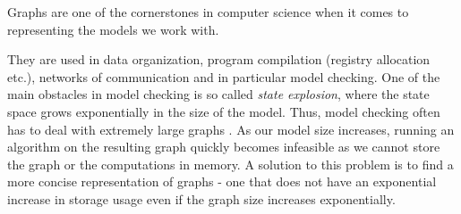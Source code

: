 \documentclass[../master/master.tex]{subfiles}
\begin{document}
Graphs are one of the cornerstones in computer science when it comes to representing the models we work with. 

They are used in data organization,  program compilation (registry allocation etc.), networks of communication and in particular model checking. One of the main obstacles in model checking is so called \textit{state explosion}, where the state space grows exponentially in the size of the model. Thus, model checking often has to deal with extremely large graphs \cite{pelanek_2004}. As our model size increases, running an algorithm on the resulting graph quickly becomes infeasible as we cannot store the graph or the computations in memory. A solution to this problem is to find a more concise representation of graphs - one that does not have an exponential increase in storage usage even if the graph size increases exponentially. 

\cite{tarjan_1971}
\end{document}
